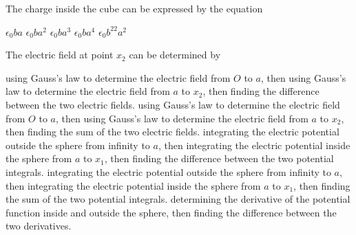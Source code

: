 \documentclass{../../oss-classkick-exam}
\begin{document}
\begin{multicols*}{2}
\begin{questions}
    \question The charge inside the cube can be expressed by the equation
    \label{cube2}
    \begin{choices}
      \choice $\epsilon_0ba$
      \choice $\epsilon_0ba^2$
      \choice $\epsilon_0ba^3$
      \choice $\epsilon_0ba^4$
      \choice $\epsilon_0b^22a^2$
    \end{choices}
    

    \question The electric field at point $x_2$ can be determined by
    \begin{choices}
      \choice using Gauss's law to determine the electric field from $O$ to $a$,
      then using Gauss's law to determine the electric field from $a$ to $x_2$,
      then finding the difference between the two electric fields.
      \choice using Gauss's law to determine the electric field from $O$ to $a$,
      then using Gauss's law to determine the electric field from $a$ to $x_2$,
      then finding the sum of the two electric fields.
      \choice integrating the electric potential outside the sphere from
      infinity to $a$, then integrating the electric potential inside the
      sphere from $a$ to $x_1$, then finding the difference between the two
      potential integrals.
      \choice integrating the electric potential outside the sphere from
      infinity to $a$, then integrating the electric potential inside the
      sphere from $a$ to $x_1$, then finding the sum of the two potential
      integrals.
      \choice determining the derivative of the potential function inside and
      outside the sphere, then finding the difference between the two
      derivatives.
    \end{choices}
    \label{sphere1}
    \columnbreak
    

\end{questions}
\end{multicols*}
\end{document}
